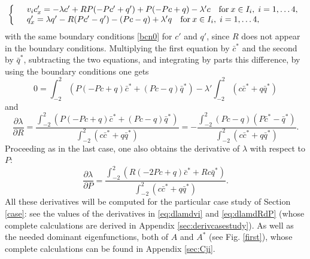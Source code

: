 \documentclass[a4paper]{article}
\numberwithin{equation}{section}
\begin{document}
\begin{equation*}%
\left\{ \begin{array}{ll}
&v_i c'_x=-\lambda c'+RP(-Pc'+q')+P(-Pc+q)-\lambda'c \quad \hbox{for}\: x\in I_i, \; i=1,\dots 4, \\
&q'_x=\lambda q'-R(Pc'-q')-(Pc-q)+\lambda'q\quad \hbox{for}\: x\in I_i, \; i=1,\dots 4,
\end{array}\right.
\end{equation*}
with the same boundary conditions \eqref{bcn0} for $c'$ and $q'$, since $R$ does not appear in the boundary conditions. Multiplying the first equation by $\bar{c}^*$ and the second by $\bar{q}^*$, subtracting the two equations, and integrating by parts this difference, by using the boundary conditions one gets
$$
0=\int_{-2}^2 (P(-Pc+q)\bar{c}^*+(Pc-q)\bar{q}^*)-\lambda'\int_{-2}^2 (c\bar{c}^*+q\bar{q}^*)
$$
and
\begin{equation}\label{lapriR}
\dfrac{\partial\lambda}{\partial R}=
\dfrac{\int_{-2}^2 (P(-Pc+q)\bar{c}^*+(Pc-q)\bar{q}^*)}{\int_{-2}^2 (c\bar{c}^*+q\bar{q}^*)}=
-\dfrac{\int_{-2}^2 (Pc-q)(P\bar{c}^*-\bar{q}^*)}{\int_{-2}^2 (c\bar{c}^*+q\bar{q}^*)}.
\end{equation}
Proceeding as in the last case, one also obtains the derivative of $\lambda$ with respect to $P$:
\begin{equation}\label{lapriP}
\dfrac{\partial\lambda}{\partial P}=
\dfrac{\int_{-2}^2 (R(-2Pc+q)\bar{c}^*+Rc\bar{q}^*)}{\int_{-2}^2 (c\bar{c}^*+q\bar{q}^*)}.
\end{equation}
All these derivatives will be computed for the particular case study of Section \ref{case}: see the values of the derivatives in \eqref{eq:dlamdvi} and \eqref{eq:dlamdRdP} (whose complete calculations are derived in Appendix \ref{sec:derivcasestudy}). As well as the needed dominant eigenfunctions, both of $A$ and $A^*$ (see Fig. \ref{first}), whose complete calculations can be found in Appendix \ref{sec:Cji}.
\end{document}
